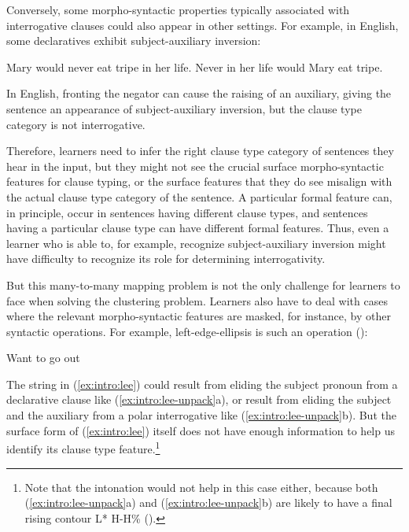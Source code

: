 Conversely, some morpho-syntactic properties typically associated with interrogative clauses could also appear in other settings. For example, in English, some declaratives exhibit subject-auxiliary inversion: 

\bxl\label{bg-syn:decreg}
Mary would never eat tripe in her life. 
\ex\label{bg-syn:decneg} Never in her life would Mary eat tripe.
\exl
\eex

In English, fronting the negator  can cause the raising of an auxiliary, giving the sentence an appearance of subject-auxiliary inversion, but the clause type category is not interrogative. %

Therefore, learners need to infer the right clause type category of sentences they hear in the input, but they might not see the crucial surface morpho-syntactic features for clause typing, or the surface features that they do see misalign with the actual clause type category of the sentence. A particular formal feature can, in principle, occur in sentences having different clause types, and sentences having a particular clause type can have different formal features. Thus, even a learner who is able to, for example, recognize subject-auxiliary inversion might have difficulty to recognize its role for determining interrogativity.

But this many-to-many mapping problem is not the only challenge for learners to face when solving the clustering problem. Learners also have to deal with cases where the relevant morpho-syntactic features are masked, for instance, by other syntactic operations. For example, left-edge-ellipsis is such an operation (\cite{zwickypullum1983leftedge}):

Want to go out
\eex

The string in (\ref{ex:intro:lee}) could result from eliding the subject pronoun from a declarative clause like (\ref{ex:intro:lee-unpack}a), or result from eliding the subject and the auxiliary from a polar interrogative like (\ref{ex:intro:lee-unpack}b). But the surface form of (\ref{ex:intro:lee}) itself does not have enough information to help us identify its clause type feature.\footnote{Note that the intonation would not help in this case either, because both (\ref{ex:intro:lee-unpack}a) and (\ref{ex:intro:lee-unpack}b) are likely to have a final rising contour L* H-H\% (\cite{gunlogson2008, jeong2018, goodhue2021rd}). } 

